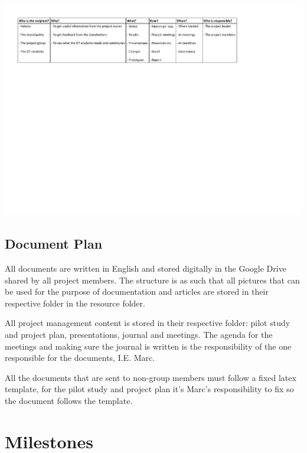 \documentclass[twoside]{report}
\begin{document}
\includegraphics[width=\linewidth]{graphics/communcationplan.pdf} 

\subsection{Document Plan}
All documents are written in English and stored digitally in the Google Drive
shared by all project members. The structure is as such that all pictures that
can be used for the purpose of documentation and articles are stored in their
respective folder in the resource folder. 

All project management content is stored in their respective folder: pilot study
and project plan, presentations, journal and meetings. The agenda for the
meetings and making sure the journal is written is the responsibility of the one
responsible for the documents, I.E. Marc. 

All the documents that are sent to non-group members must follow a fixed latex
template, for the pilot study and project plan it’s Marc’s responsibility to
fix so the document follows the template. 

\newpage
\section{Milestones}
\end{document}
